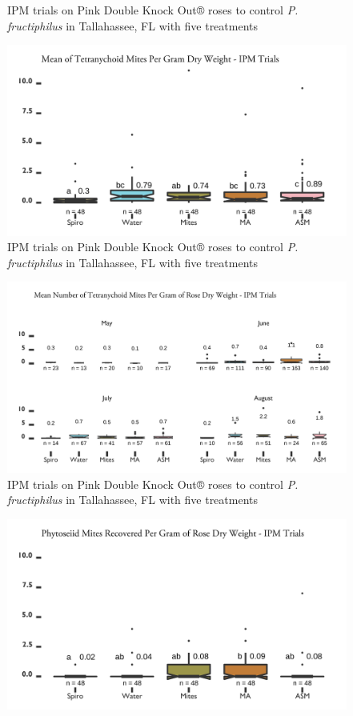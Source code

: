 \documentclass[12pt,final,CPage]{ufthesis}
\begin{document}
{\begin{figure}
{  }

  \caption{IPM trials on Pink Double Knock Out® roses to control \textit{P. fructiphilus} in Tallahassee, FL with five treatments}\label{fig:ipm-talla-erios-month}
  \end{figure}
  \begin{figure}

  {\centering \includegraphics[width=0.8\linewidth]{figure/rrv_ipm_graph_tets_talla} 

  }

  \caption{IPM trials on Pink Double Knock Out® roses to control \textit{P. fructiphilus} in Tallahassee, FL with five treatments}\label{fig:ipm-talla-tets}
  \end{figure}
  \begin{figure}

  {\centering \includegraphics[width=0.8\linewidth]{figure/rrv_ipm_graph_tets_talla_month} 

  }

  \caption{IPM trials on Pink Double Knock Out® roses to control \textit{P. fructiphilus} in Tallahassee, FL with five treatments}\label{fig:ipm-talla-tets-month}
  \end{figure}
  \begin{figure}

  {\centering \includegraphics[width=0.8\linewidth]{figure/rrv_ipm_graph_preds_talla} 

}
\end{figure}}
\end{document}

